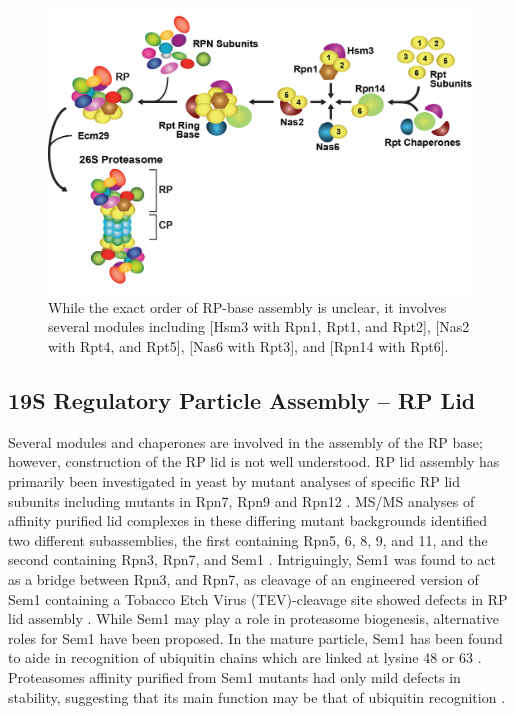 \begin{figure}
	\centering
	\includegraphics[width=\columnwidth]{intro/rpassembly.png}
	{While the exact order of RP-base assembly is unclear, it involves several modules including [Hsm3 with Rpn1, Rpt1, and Rpt2], [Nas2 with Rpt4, and Rpt5], [Nas6 with Rpt3], and [Rpn14 with Rpt6].}
	\label{fig:rpassembly}
\end{figure}

\subsection{19S Regulatory Particle Assembly – RP Lid}
	Several modules and chaperones are involved in the assembly of the RP base; however, construction of the RP lid is not well understood. RP lid assembly has primarily been investigated in yeast by mutant analyses of specific RP lid subunits including mutants in Rpn7, Rpn9 and Rpn12 \citep{fukunaga10}. MS/MS analyses of affinity purified lid complexes in these differing mutant backgrounds identified two different subassemblies, the first containing Rpn5, 6, 8, 9, and 11, and the second containing Rpn3, Rpn7, and Sem1 \citep{fukunaga10}. Intriguingly, Sem1 was found to act as a bridge between Rpn3, and Rpn7, as cleavage of an engineered version of Sem1 containing a Tobacco Etch Virus (TEV)-cleavage site showed defects in RP lid assembly \citep{tomko14}. While Sem1 may play a role in proteasome biogenesis, alternative roles for Sem1 have been proposed.  In the mature particle, Sem1 has been found to aide in recognition of ubiquitin chains which are linked at lysine 48 or 63 \citep{paraskevopoulos14}. Proteasomes affinity purified from Sem1 mutants had only mild defects in stability, suggesting that its main function may be that of ubiquitin recognition \citep{paraskevopoulos14}.
	
